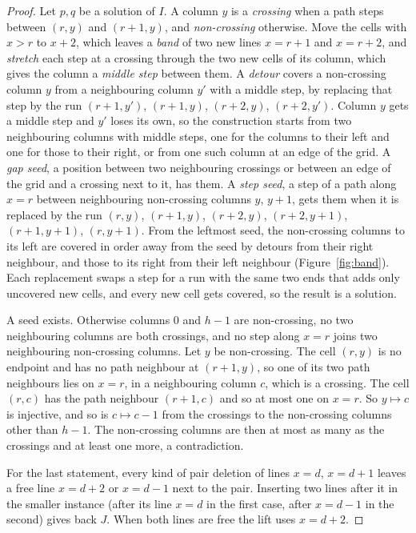 \documentclass[11pt]{article}
\begin{document}
\begin{proof}
Let $p,q$ be a solution of $I$. A column $y$ is a \emph{crossing} when a path steps between
$(r,y)$ and $(r+1,y)$, and \emph{non-crossing} otherwise. Move the cells with $x>r$ to $x+2$,
which leaves a \emph{band} of two new lines $x=r+1$ and $x=r+2$, and \emph{stretch} each step at a crossing through
the two new cells of its column, which gives the column a \emph{middle step} between them. A
\emph{detour} covers a non-crossing column $y$ from a neighbouring column $y'$ with a middle step,
by replacing that step by the run $(r+1,y')$, $(r+1,y)$, $(r+2,y)$, $(r+2,y')$. Column $y$ gets a
middle step and $y'$ loses its own, so the construction starts from two neighbouring columns with
middle steps, one for the columns to their left and one for those to their right, or from one
such column at an edge of the grid. A \emph{gap seed}, a position between two neighbouring
crossings or between an edge of the grid and a crossing next to it, has them. A \emph{step seed},
a step of a path along $x=r$ between neighbouring non-crossing columns $y$, $y+1$, gets them when
it is replaced by the run $(r,y)$, $(r+1,y)$, $(r+2,y)$, $(r+2,y+1)$, $(r+1,y+1)$, $(r,y+1)$. From
the leftmost seed, the non-crossing columns to its left are covered in order away from the seed by detours from their
right neighbour, and those to its right from their left neighbour (Figure~\ref{fig:band}). Each
replacement swaps a step for a run with the same two ends that adds only uncovered new cells, and
every new cell gets covered, so the result is a solution.

A seed exists. Otherwise columns $0$ and $h-1$ are non-crossing, no two neighbouring columns are
both crossings, and no step along $x=r$ joins two neighbouring non-crossing columns. Let $y$ be
non-crossing. The cell $(r,y)$ is no endpoint and has no path neighbour at $(r+1,y)$, so one of
its two path neighbours lies on $x=r$, in a neighbouring column $c$, which is a crossing. The
cell $(r,c)$ has the path neighbour $(r+1,c)$ and so at most one on $x=r$. So $y\mapsto c$ is
injective, and so is $c\mapsto c-1$ from the crossings to the non-crossing columns other than
$h-1$. The non-crossing columns are then at most as many as the crossings and at least one more,
a contradiction.

For the last statement, every kind of pair deletion of lines $x=d$, $x=d+1$ leaves a free line
$x=d+2$ or $x=d-1$ next to the pair. Inserting two lines after it in the smaller instance (after
its line $x=d$ in the first case, after $x=d-1$ in the second) gives back $J$. When both lines are
free the lift uses $x=d+2$.
\end{proof}
\end{document}
